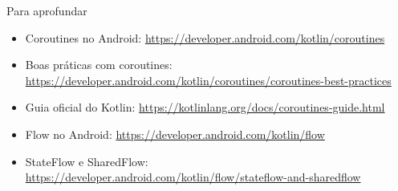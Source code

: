 \documentclass[aspectratio=169,10pt]{beamer}
\begin{document}
\begin{frame}{Para aprofundar}
  \small
  \begin{itemize}
    \item Coroutines no Android: \url{https://developer.android.com/kotlin/coroutines}
    \item Boas práticas com coroutines: \url{https://developer.android.com/kotlin/coroutines/coroutines-best-practices}
    \item Guia oficial do Kotlin: \url{https://kotlinlang.org/docs/coroutines-guide.html}
    \item Flow no Android: \url{https://developer.android.com/kotlin/flow}
    \item StateFlow e SharedFlow: \url{https://developer.android.com/kotlin/flow/stateflow-and-sharedflow}
  \end{itemize}
\end{frame}

\end{document}
